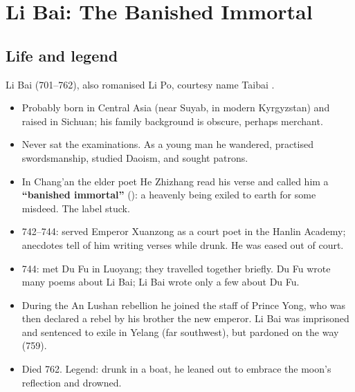 \chapter{Li Bai: The Banished Immortal}

\section{Life and legend}

Li Bai  (701--762), also romanised Li Po, courtesy name Taibai .

\begin{itemize}
  \item Probably born in Central Asia (near Suyab, in modern Kyrgyzstan) and raised in
        Sichuan; his family background is obscure, perhaps merchant.
  \item Never sat the examinations. As a young man he wandered, practised swordsmanship,
        studied Daoism, and sought patrons.
  \item In Chang'an the elder poet He Zhizhang  read his verse and called him a
        \textbf{``banished immortal''} (): a heavenly being exiled to earth for
        some misdeed. The label stuck.
  \item 742--744: served Emperor Xuanzong as a court poet in the Hanlin Academy; anecdotes
        tell of him writing verses while drunk. He was eased out of court.
  \item 744: met Du Fu in Luoyang; they travelled together briefly. Du Fu wrote many poems
        about Li Bai; Li Bai wrote only a few about Du Fu.
  \item During the An Lushan rebellion he joined the staff of Prince Yong, who was then
        declared a rebel by his brother the new emperor. Li Bai was imprisoned and
        sentenced to exile in Yelang (far southwest), but pardoned on the way (759).
  \item Died 762. Legend: drunk in a boat, he leaned out to embrace the moon's reflection and
        drowned.
\end{itemize}

